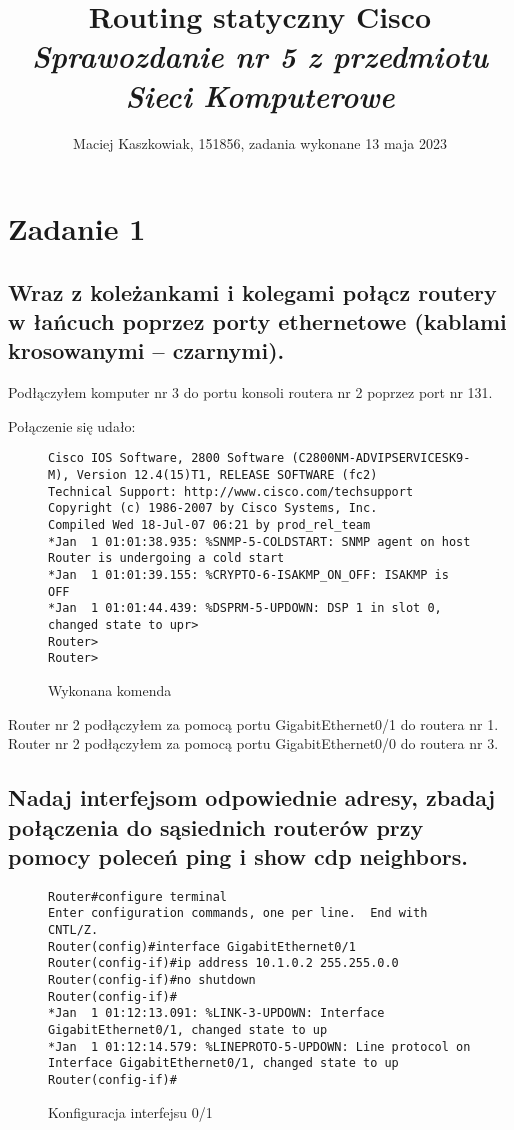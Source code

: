 \documentclass[polish, a4paper]{article}
\title{Routing statyczny Cisco\\
        \Large \emph{Sprawozdanie nr 5 z przedmiotu Sieci Komputerowe}}
\author{Maciej Kaszkowiak, 151856, zadania wykonane 13 maja 2023}
\date{\vspace{-5ex}} %
\begin{document}
\maketitle

\tableofcontents

\newpage

\section{Zadanie 1}
\subsection{Wraz z koleżankami i kolegami połącz routery w łańcuch poprzez porty ethernetowe (kablami krosowanymi – czarnymi).}

Podłączyłem komputer nr 3 do portu konsoli routera nr 2 poprzez port nr 131.

Połączenie się udało:

\begin{figure}[H]
\begin{verbatim}
Cisco IOS Software, 2800 Software (C2800NM-ADVIPSERVICESK9-M), Version 12.4(15)T1, RELEASE SOFTWARE (fc2)
Technical Support: http://www.cisco.com/techsupport
Copyright (c) 1986-2007 by Cisco Systems, Inc.
Compiled Wed 18-Jul-07 06:21 by prod_rel_team
*Jan  1 01:01:38.935: %SNMP-5-COLDSTART: SNMP agent on host Router is undergoing a cold start
*Jan  1 01:01:39.155: %CRYPTO-6-ISAKMP_ON_OFF: ISAKMP is OFF
*Jan  1 01:01:44.439: %DSPRM-5-UPDOWN: DSP 1 in slot 0, changed state to upr>
Router>
Router>
\end{verbatim}
\caption{Wykonana komenda}
\end{figure}

Router nr 2 podłączyłem za pomocą portu GigabitEthernet0/1 do routera nr 1.
Router nr 2 podłączyłem za pomocą portu GigabitEthernet0/0 do routera nr 3.

\subsection{Nadaj interfejsom odpowiednie adresy, zbadaj połączenia do sąsiednich routerów przy pomocy poleceń ping i show cdp neighbors.}

\begin{figure}[H]
\begin{verbatim}
Router#configure terminal
Enter configuration commands, one per line.  End with CNTL/Z.
Router(config)#interface GigabitEthernet0/1
Router(config-if)#ip address 10.1.0.2 255.255.0.0
Router(config-if)#no shutdown
Router(config-if)#
*Jan  1 01:12:13.091: %LINK-3-UPDOWN: Interface GigabitEthernet0/1, changed state to up
*Jan  1 01:12:14.579: %LINEPROTO-5-UPDOWN: Line protocol on Interface GigabitEthernet0/1, changed state to up
Router(config-if)#
\end{verbatim}
\caption{Konfiguracja interfejsu 0/1}
\end{figure}
\end{document}
